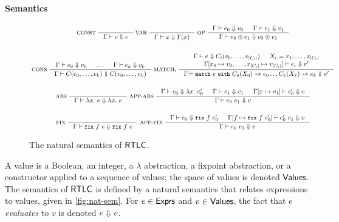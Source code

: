 \paragraph{Semantics}
%
\begin{figure*}
  \centering
  \begin{gather*}
  \inference[ CONST ]{ }{ \Gamma \judges c \evalsto c } 
  \inference[ VAR ]{ }{ \Gamma \judges x \evalsto \Gamma(x) }
  \inference[ OP ]{ %
    \Gamma \judges e_0 \evalsto v_0 & %
    \Gamma \judges e_1 \evalsto v_1 } %
  { \Gamma \judges e_0 \oplus e_1 \evalsto v_0 \oplus v_1 } \\ \\
  \inference[ CONS ]{ %
    \Gamma \judges e_0 \evalsto v_0 & \ldots & %
    \Gamma \judges e_k \evalsto v_k } %
  { \Gamma \judges C(e_0, \ldots, e_k) \evalsto C(v_0, \ldots, v_k) }
  \inference[ $\mathrm{MATCH}_{i}$ ]{ %
    \Gamma \judges e \evalsto C_i(v_0, \ldots, v_{ |C_i| }) & %
    X_i = x_1, \ldots, x_{|C_i|} \\ %
    \Gamma[ x_0 \mapsto v_0, \ldots, x_{|C_i|} \mapsto v_{|C_i|} ]
    \judges %
    e_i \evalsto v' } %
  { \Gamma \judges \cc{match}\ e\ \cc{with}\ %
    C_0(X_0)\ \cc{->}\ e_0 %
    \ldots %
    C_k(X_k)\ \cc{->}\ e_k \evalsto v' } \\ \\
  \inference[ ABS ]{ } %
  { \Gamma \judges \lambda x.\ e \evalsto \lambda x.\ e }
  \inference[ APP-ABS ]{ %
    \Gamma \judges e_0 \evalsto \lambda x.\ e_0' & %
    \Gamma \judges e_1 \evalsto v_1 & %
    \upd{\Gamma}{x}{v_1} \judges e_0' \evalsto v }
  { \Gamma \judges e_0\ e_1 \evalsto v } \\ \\
  \inference[ FIX ]{ } %
  { \Gamma \judges \fix{ f }{ e } \evalsto \fix{ f }{ e } } 
  \inference[ APP-FIX ]{ %
    \Gamma \judges e_0 \evalsto \fix{ f }{ e_0' } & %
    \upd{ \Gamma }{ f }{ \fix{ f }{ e_0' } } \judges %
    e_0'\ e_1 \evalsto v }
  { \Gamma \judges e_0\ e_1 \evalsto v } 
  \end{gather*}
  \caption{The natural semantics of $\mathsf{RTLC}$.}
  \label{fig:nat-sem}
\end{figure*}
%
A value is a Boolean, an integer, a $\lambda$ abstraction, a fixpoint
abstraction, or a constructor applied to a sequence of values;
%
the space of values is denoted $\mathsf{Values}$.
%
The semantics of $\mathsf{RTLC}$ is defined by a natural semantics that
relates expressions to values, given in \autoref{fig:nat-sem}.
%
For $e \in \mathsf{Exprs}$ and $v \in \mathsf{Values}$, the fact that $e$
\emph{evaluates} to $v$ is denoted $e \Downarrow v$.

